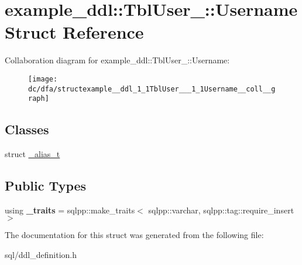 \hypertarget{structexample__ddl_1_1TblUser___1_1Username}{}\section{example\+\_\+ddl\+:\+:Tbl\+User\+\_\+\+:\+:Username Struct Reference}
\label{structexample__ddl_1_1TblUser___1_1Username}


Collaboration diagram for example\+\_\+ddl\+:\+:Tbl\+User\+\_\+\+:\+:Username\+:
\nopagebreak
\begin{figure}[H]
\begin{center}
\leavevmode
\texttt{[image: dc/dfa/structexample\_\_ddl\_1\_1TblUser\_\_\_1\_1Username\_\_coll\_\_graph]}
\end{center}
\end{figure}
\subsection*{Classes}
\begin{DoxyCompactItemize}
\item 
struct \hyperlink{structexample__ddl_1_1TblUser___1_1Username_1_1__alias__t}{\+\_\+alias\+\_\+t}
\end{DoxyCompactItemize}
\subsection*{Public Types}
\begin{DoxyCompactItemize}
\item 
\hypertarget{structexample__ddl_1_1TblUser___1_1Username_aee5a2d242639b6f2fbd249b18e847926}{}using {\bfseries \+\_\+traits} = sqlpp\+::make\+\_\+traits$<$ sqlpp\+::varchar, sqlpp\+::tag\+::require\+\_\+insert $>$\label{structexample__ddl_1_1TblUser___1_1Username_aee5a2d242639b6f2fbd249b18e847926}

\end{DoxyCompactItemize}


The documentation for this struct was generated from the following file\+:\begin{DoxyCompactItemize}
\item 
sql/ddl\+\_\+definition.\+h\end{DoxyCompactItemize}
